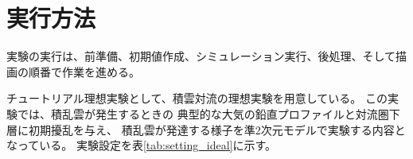 \section{実行方法} \label{sec:ideal_exp_run}

実験の実行は、前準備、初期値作成、シミュレーション実行、後処理、そして描画の順番で作業を進める。


チュートリアル理想実験として、積雲対流の理想実験を用意している。
この実験では、積乱雲が発生するときの
典型的な大気の鉛直プロファイルと対流圏下層に初期擾乱を与え、
積乱雲が発達する様子を準2次元モデルで実験する内容となっている。
実験設定を表\ref{tab:setting_ideal}に示す。

